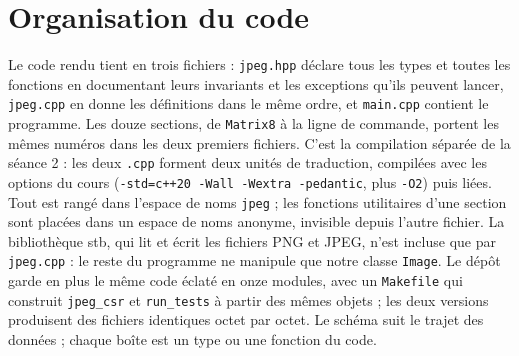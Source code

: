 \documentclass[10pt,a4paper]{article}
\newcommand{\code}[1]{\texttt{#1}}
\begin{document}
\section{Organisation du code}
Le code rendu tient en trois fichiers : \code{jpeg.hpp} déclare tous les types et toutes les
fonctions en documentant leurs invariants et les exceptions qu'ils peuvent lancer,
\code{jpeg.cpp} en donne les définitions dans le même ordre, et \code{main.cpp} contient le
programme. Les douze sections, de \code{Matrix8} à la ligne de commande, portent les mêmes
numéros dans les deux premiers fichiers. C'est la compilation séparée de la séance 2 : les deux
\code{.cpp} forment deux unités de traduction, compilées avec les options du cours
(\code{-std=c++20 -Wall -Wextra -pedantic}, plus \code{-O2}) puis liées. Tout est rangé dans
l'espace de noms \code{jpeg} ; les fonctions utilitaires d'une section sont placées dans un
espace de noms anonyme, invisible depuis l'autre fichier. La bibliothèque stb, qui lit et écrit
les fichiers PNG et JPEG, n'est incluse que par \code{jpeg.cpp} : le reste du programme ne
manipule que notre classe \code{Image}. Le dépôt garde en plus le même code éclaté en onze
modules, avec un \code{Makefile} qui construit \code{jpeg\_csr} et \code{run\_tests} à partir des
mêmes objets ; les deux versions produisent des fichiers identiques octet par octet. Le schéma
suit le trajet des données ; chaque boîte est un type ou une fonction du code.

\begin{center}
\end{center}
\end{document}
